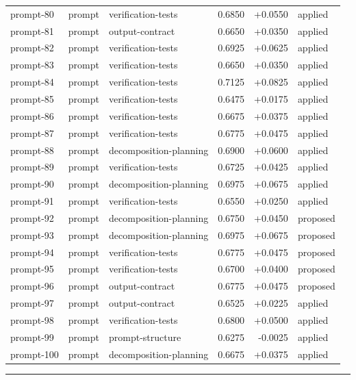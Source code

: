 \begin{center}
\begin{longtable}{llp{5.2cm}rrl}
prompt-80 & prompt & verification-tests & 0.6850 & +0.0550 & applied \\
prompt-81 & prompt & output-contract & 0.6650 & +0.0350 & applied \\
prompt-82 & prompt & verification-tests & 0.6925 & +0.0625 & applied \\
prompt-83 & prompt & verification-tests & 0.6650 & +0.0350 & applied \\
prompt-84 & prompt & verification-tests & 0.7125 & +0.0825 & applied \\
prompt-85 & prompt & verification-tests & 0.6475 & +0.0175 & applied \\
prompt-86 & prompt & verification-tests & 0.6675 & +0.0375 & applied \\
prompt-87 & prompt & verification-tests & 0.6775 & +0.0475 & applied \\
prompt-88 & prompt & decomposition-planning & 0.6900 & +0.0600 & applied \\
prompt-89 & prompt & verification-tests & 0.6725 & +0.0425 & applied \\
prompt-90 & prompt & decomposition-planning & 0.6975 & +0.0675 & applied \\
prompt-91 & prompt & verification-tests & 0.6550 & +0.0250 & applied \\
prompt-92 & prompt & decomposition-planning & 0.6750 & +0.0450 & proposed \\
prompt-93 & prompt & decomposition-planning & 0.6975 & +0.0675 & proposed \\
prompt-94 & prompt & verification-tests & 0.6775 & +0.0475 & proposed \\
prompt-95 & prompt & verification-tests & 0.6700 & +0.0400 & proposed \\
prompt-96 & prompt & output-contract & 0.6775 & +0.0475 & proposed \\
prompt-97 & prompt & output-contract & 0.6525 & +0.0225 & applied \\
prompt-98 & prompt & verification-tests & 0.6800 & +0.0500 & applied \\
prompt-99 & prompt & prompt-structure & 0.6275 & -0.0025 & applied \\
prompt-100 & prompt & decomposition-planning & 0.6675 & +0.0375 & applied \\
\bottomrule\end{longtable}\end{center}
\par\bigskip\hrule\bigskip
